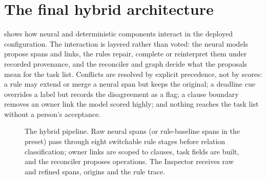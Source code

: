 \section{The final hybrid architecture}
 shows how neural and deterministic components interact in the deployed configuration. The interaction is layered rather than voted: the neural models propose spans and links, the rules repair, complete or reinterpret them under recorded provenance, and the reconciler and graph decide what the proposals mean for the task list. Conflicts are resolved by explicit precedence, not by scores: a rule may extend or merge a neural span but keeps the original; a deadline cue overrides a  label but records the disagreement as a flag; a clause boundary removes an owner link the model scored highly; and nothing reaches the task list without a person's acceptance.

\begin{figure}[t]
\centering
{}
\caption[Hybrid system architecture]{The hybrid pipeline. Raw neural spans (or rule-baseline spans in the  preset) pass through eight switchable rule stages before relation classification; owner links are scoped to clauses, task fields are built, and the reconciler proposes operations. The Inspector receives raw and refined spans, origins and the rule trace.}
\label{fig:hybrid}
\end{figure}
